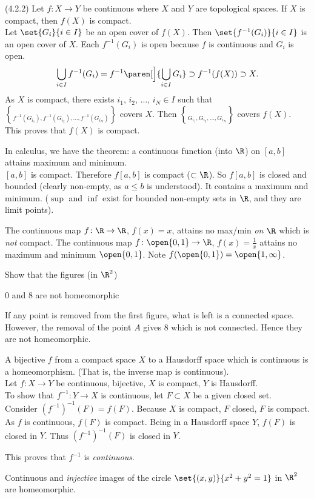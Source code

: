 \thm (4.2.2) Let $f\colon X\to Y$ be continuous where $X$ and $Y$ are topological spaces.  If $X$ is compact, then $f(X)$ is compact. \\
\pf Let $\set{G_i}{i\in I}$ be an open cover of $f(X)$.  Then $\set{f^{-1}(G_i)}{i\in I}$ is an open cover of $X$.  Each $f^{-1}(G_i)$ is open because $f$ is continuous and $G_i$ is open.
\[ \bigcup_{i\in I} f^{-1}(G_i) = f^{-1}\paren[\Big]{\bigcup_{i\in I}G_i} \supset f^{-1}(f(X)) \supset X . \]
As $X$ is compact, there exists $i_1$, $i_2$, $\dotsc$, $i_N\in I$ such that $\brace{f^{-1}(G_{i_1}),f^{-1}(G_{i_2}),\dotsc,f^{-1}(G_{i_N})}$ covers $X$.  Then $\brace{G_{i_1},G_{i_2},\dotsc,G_{i_N}}$ covers $f(X)$.  This proves that $f(X)$ is compact.

\comment In calculus, we have the theorem: a continuous function (into $\R$) on $[a,b]$ attains maximum and minimum. \\
\pf $[a,b]$ is compact.  Therefore $f[a,b]$ is compact ($\subset\R$).  So $f[a,b]$ is closed and bounded (clearly non-empty, as $a\leq b$ is understood).  It contains a maximum and minimum.  ($\sup$ and $\inf$ exist for bounded non-empty sets in $\R$, and they are limit points).

\eg The continuous map $f\colon\R\to\R$, $f(x)=x$, attains no max/min \emph{on\/ $\R$} which is \emph{not} compact.  The continuous map $f\colon\open{0,1}\to\R$, $f(x)=\tfrac{1}{x}$ attains no maximum and minimum $\open{0,1}$.  Note $f(\open{0,1})=\open{1,\infty}$.

\eg Show that the figures (in $\R^2$)
\begin{center}\textsf{0} and \textsf{8} are not homeomorphic\end{center}
\pf If any point is removed from the first figure, what is left is a connected space.  However, the removal of the point $A$ gives \textsf{8}\llap{\raisebox{0.25pt}{\bf\tiny$^\circ$}} which is not connected.  Hence they are not homeomorphic.

\thm A bijective $f$ from a compact space $X$ to a Hausdorff space which is continuous is a homeomorphism.  (That is, the inverse map is continuous). \\
\pf  Let $f\colon X\to Y$ be continuous, bijective, $X$ is compact, $Y$ is Hausdorff. \\
To show that $f^{-1}\colon Y\to X$ is continuous, let $F\subset X$ be a given closed set. \\
Consider $(f^{-1})^{-1}(F)=f(F)$.  Because $X$ is compact, $F$ closed, $F$ is compact.  As $f$ is continuous, $f(F)$ is compact.  Being in a Hausdorff space $Y$, $f(F)$ is closed in $Y$.  Thus $(f^{-1})^{-1}(F)$ is closed in $Y$.

This proves that $f^{-1}$ is \emph{continuous}.

\cor Continuous and \emph{injective} images of the circle $\set{(x,y)}{x^2+y^2=1}$ in $\R^2$ are homeomorphic.
